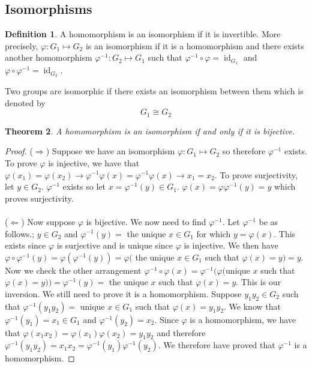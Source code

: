 \documentclass{article}
\DeclareMathOperator{\id}{id}
\newtheorem{theorem}{Theorem}[section]
\theoremstyle{definition}
\newtheorem{definition}[theorem]{Definition}
\begin{document}
\subsection{Isomorphisms}
\begin{definition}
    A homomorphism is an isomorphism if it is invertible. More precisely, $\varphi : G_1 \mapsto G_2$ is an isomorphism if it is a homomorphism and there exists another homomorphism $\varphi ^{-1} : G_2 \mapsto G_1$ such that $\varphi ^{-1} \circ \varphi = \id _{G_1}$ and $\varphi \circ \varphi^{-1} = \id_{G_2}$.
\end{definition}
Two groups are isomorphic if there exists an isomorphism between them which is denoted by 
\begin{equation*}
    G_1 \cong G_2
\end{equation*}
\begin{theorem}
    A homomorphism is an isomorphism if and only if it is bijective.
\end{theorem}
\begin{proof}
    ($\Rightarrow$) Suppose we have an isomorphism $\varphi : G_1 \mapsto G_2$ so therefore $\varphi ^{-1}$ exists. To prove $\varphi$ is injective, we have that $\varphi (x_1)=\varphi (x_2) \rightarrow \varphi^{-1}\varphi(x)=\varphi^{-1}\varphi(x) \rightarrow x_1=x_2$. To prove surjectivity, let $y\in G_2$. $\varphi^{-1}$ exists so let $x=\varphi^{-1}(y) \in G_1$. $\varphi (x) =\varphi \varphi^{-1}(y)=y$ which proves surjectivity. \\\\
    ($\Leftarrow$) Now suppose $\varphi$ is bijective. We now need to find $\varphi ^{-1}$. Let $\varphi ^{-1}$ be as follows.; $y\in G_2$ and $\varphi^{-1} (y) = $ the unique $x\in G_1$ for which $y=\varphi(x)$. This exists since $\varphi $ is surjective and is unique since $\varphi$ is injective. We then have $\varphi \circ \varphi^{-1} (y) = \varphi (\varphi^{-1}(y))=\varphi($ the unique $x\in G_1$ such that $\varphi(x)=y)=y$. Now we check the other arrangement $\varphi ^{-1} \circ \varphi(x) = \varphi^{-1}(\varphi ($unique $x$ such that $\varphi(x)=y)) = \varphi^{-1}(y) = $ the unique $x$ such that $\varphi(x)=y$. This is our inversion. We still need to prove it is a homomorphism. Suppose $y_1 y_2 \in G_2 $ such that $\varphi^{-1} (y_1y_2) = $ unique $x\in G_1$ such that $\varphi(x)=y_1y_2$. We know that $\varphi ^{-1}(y_1) =x_1 \in G_1$ and $\varphi ^{-1}(y_2) =x_2$. Since $\varphi$ is a homomorphism, we have that $\varphi (x_1x_2) = \varphi(x_1)\varphi(x_2) = y_1y_2$ and therefore $\varphi^{-1}(y_1y_2) =x_1x_2 = \varphi ^{-1}(y_1)\varphi^{-1}(y_2)$. We therefore have proved that $\varphi^{-1}$ is a homomorphism.
\end{proof}
\end{document}
